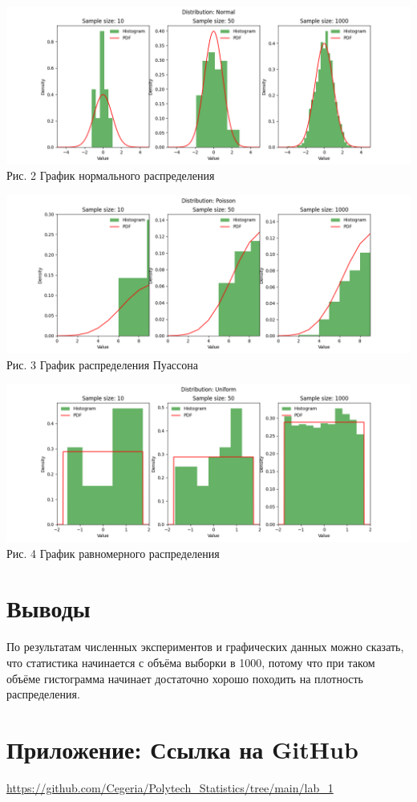 \documentclass[12pt]{article}
\begin{document}
\begin{center}
    \includegraphics[scale=0.6]{lab_1_Normal.png} \\
    Рис. 2 График нормального распределения
\end{center}

\begin{center}
    \includegraphics[scale=0.6]{lab_1_Poisson.png} \\
    Рис. 3 График распределения Пуассона
\end{center}

\begin{center}
    \includegraphics[scale=0.6]{lab_1_Uniform.png} \\
    Рис. 4 График равномерного распределения
\end{center}

\section{Выводы}
По результатам численных экспериментов и графических данных можно сказать, что статистика начинается с объёма выборки в 1000, потому что при таком объёме гистограмма начинает достаточно хорошо походить на плотность распределения.
\section*{Приложение: Ссылка на GitHub}
\url{https://github.com/Cegeria/Polytech\_Statistics/tree/main/lab\_1}
\end{document}

